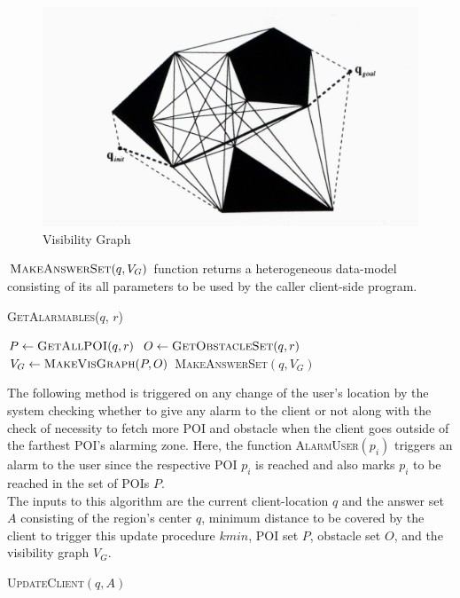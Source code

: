 \begin{figure}[h]
  \includegraphics[width=\linewidth]{visibility_graph.jpg}
  \caption{Visibility Graph}
  \label{fig:visgraph}
\end{figure}
\vspace{5pt}
$\textsc{MakeAnswerSet}(q, V_G)$ function returns a heterogeneous data-model consisting of its all parameters to be used by the caller client-side program.


\DontPrintSemicolon
\begin{algorithm}
\caption{\textsc{GetAlarmables}($q$, $r$)}
	
	 $P \gets \textsc{GetAllPOI}(q, r)$ \;
	 $O \gets \textsc{GetObstacleSet}(q, r)$ \;
	 $V_G \gets \textsc{MakeVisGraph}(P, O)$ \;
	\Return \textsc{MakeAnswerSet}$(q, V_G)$ \;
\label{GetAlarmables}
\end{algorithm}

The following method is triggered on any change of the user's location by the system checking whether to give any alarm to the client or not along with the check of necessity to fetch more POI and obstacle when the client goes outside of the farthest POI's alarming zone.
Here, the function \textsc{AlarmUser}$(p_i)$ triggers an alarm to the user since the respective POI $p_i$ is reached and also marks $p_i$ to be reached in the set of POIs $P$. \\
The inputs to this algorithm are the current client-location $q$ and the answer set $A$ consisting of the region's center $q$, minimum distance to be covered by the client to trigger this update procedure $k{min}$, POI set $P$, obstacle set $O$, and the visibility graph $V_G$.
\begin{algorithm}
\caption{\textsc{UpdateClient}$(q, A)$}

    
	  {
	}
\label{UpdateClient}
\end{algorithm}


